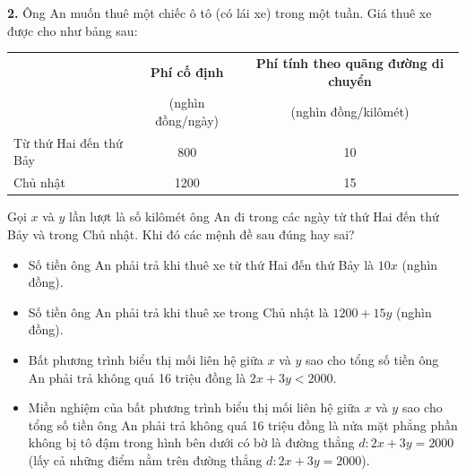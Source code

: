 \documentclass[12pt,a4paper]{extarticle}
\begin{document}
\textbf{2.} Ông An muốn thuê một chiếc ô tô (có lái xe) trong một tuần. Giá thuê xe được cho như bảng sau:

\begin{center}
\begin{tabular}{|l|c|c|}
\hline
 & \textbf{Phí cố định} & \textbf{Phí tính theo quãng đường di chuyển} \\
 & (nghìn đồng/ngày) & (nghìn đồng/kilômét) \\
\hline
Từ thứ Hai đến thứ Bảy & 800 & 10 \\
\hline
Chủ nhật & 1200 & 15 \\
\hline
\end{tabular}
\end{center}

Gọi $x$ và $y$ lần lượt là số kilômét ông An đi trong các ngày từ thứ Hai đến thứ Bảy và trong Chủ nhật. Khi đó các mệnh đề sau đúng hay sai?
\begin{itemize}
    \item[a)] Số tiền ông An phải trả khi thuê xe từ thứ Hai đến thứ Bảy là $10x$ (nghìn đồng).
    \item[b)] Số tiền ông An phải trả khi thuê xe trong Chủ nhật là $1200 + 15y$ (nghìn đồng).
    \item[c)] Bất phương trình biểu thị mối liên hệ giữa $x$ và $y$ sao cho tổng số tiền ông An phải trả không quá 16 triệu đồng là $2x + 3y < 2000$.
    \item[d)] Miền nghiệm của bất phương trình biểu thị mối liên hệ giữa $x$ và $y$ sao cho tổng số tiền ông An phải trả không quá 16 triệu đồng là nửa mặt phẳng phần không bị tô đậm trong hình bên dưới có bờ là đường thẳng $d: 2x + 3y = 2000$ (lấy cả những điểm nằm trên đường thẳng $d: 2x + 3y = 2000$).
\end{itemize}
\begin{center}
\end{center}
\end{document}

